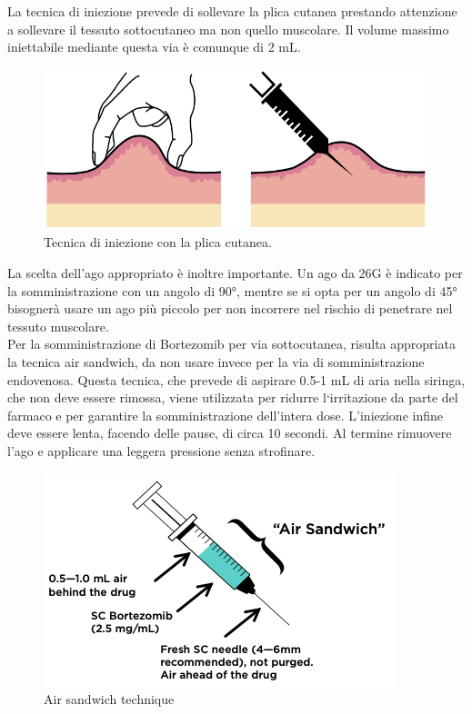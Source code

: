 La tecnica di iniezione prevede di sollevare la plica cutanea prestando attenzione a sollevare il tessuto 
sottocutaneo ma non quello muscolare. Il volume massimo iniettabile mediante questa via è comunque di 2 mL.\\

\begin{figure}[H]
    \begin{center}
    \includegraphics[width=0.8\columnwidth]{img/PLICA.png}
    \end{center}
    \caption[ Tecnica di iniezione con la plica cutanea.]{ Tecnica di iniezione con la plica cutanea.
    \cite{img33}}

\end{figure}

La scelta dell’ago appropriato è inoltre importante. Un ago da 26G è indicato per la somministrazione con un angolo di
90°, mentre se si opta per un angolo di 45° bisognerà usare un ago più piccolo per non incorrere nel rischio di 
penetrare nel tessuto muscolare\cite{BORTNURSES}.\\
Per la somministrazione di Bortezomib per via sottocutanea, risulta appropriata la tecnica air sandwich, 
da non usare invece per la via di somministrazione endovenosa. Questa tecnica, che prevede di aspirare 0.5-1 mL 
di aria nella siringa, che non deve essere rimossa, viene utilizzata per ridurre l‘irritazione da parte del farmaco e 
per garantire la somministrazione dell’intera dose. L’iniezione infine deve essere lenta, facendo delle pause, 
di circa 10 secondi. Al termine rimuovere l’ago e applicare una leggera pressione senza strofinare\cite{BORTNURSES}.\\

\begin{figure}[H]
    \begin{center}
    \includegraphics[width=0.6\columnwidth]{img/SIRINGA.png}
    \end{center}
    \caption[ Air sandwich technique]{ Air sandwich technique
    \cite{img34}}

\end{figure}

